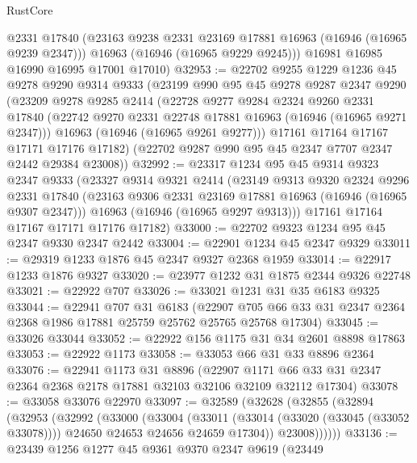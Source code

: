 \begin{lexlean}{RustCore}
\begin{coremodule}
        @2331
        @17840
        (@23163 @9238 @2331 @23169 @17881 @16963 (@16946 (@16965 @9239 @2347)))
        @16963
        (@16946 (@16965 @9229 @9245)))
      @16981
      @16985
      @16990
      @16995
      @17001
      @17010)
@32953 := @22702
    @9255
    @1229
    @1236
    @45
    @9278
    @9290
    @9314
    @9333
    (@23199
      @990
      @95
      @45
      @9278
      @9287
      @2347
      @9290
      (@23209
        @9278
        @9285
        @2414
        (@22728
          @9277
          @9284
          @2324
          @9260
          @2331
          @17840
          (@22742 @9270 @2331 @22748 @17881 @16963 (@16946 (@16965 @9271 @2347)))
          @16963
          (@16946 (@16965 @9261 @9277)))
        @17161
        @17164
        @17167
        @17171
        @17176
        @17182)
      (@22702 @9287 @990 @95 @45 @2347 @7707 @2347 @2442 @29384 @23008))
@32992 := @23317
    @1234
    @95
    @45
    @9314
    @9323
    @2347
    @9333
    (@23327
      @9314
      @9321
      @2414
      (@23149
        @9313
        @9320
        @2324
        @9296
        @2331
        @17840
        (@23163 @9306 @2331 @23169 @17881 @16963 (@16946 (@16965 @9307 @2347)))
        @16963
        (@16946 (@16965 @9297 @9313)))
      @17161
      @17164
      @17167
      @17171
      @17176
      @17182)
@33000 := @22702 @9323 @1234 @95 @45 @2347 @9330 @2347 @2442
@33004 := @22901 @1234 @45 @2347 @9329
@33011 := @29319 @1233 @1876 @45 @2347 @9327 @2368 @1959
@33014 := @22917 @1233 @1876 @9327
@33020 := @23977 @1232 @31 @1875 @2344 @9326 @22748
@33021 := @22922 @707
@33026 := @33021 @1231 @31 @35 @6183 @9325
@33044 := @22941
    @707
    @31
    @6183
    (@22907 @705 @66 @33 @31 @2347 @2364 @2368 @1986 @17881 @25759 @25762 @25765 @25768 @17304)
@33045 := @33026 @33044
@33052 := @22922 @156 @1175 @31 @34 @2601 @8898 @17863
@33053 := @22922 @1173
@33058 := @33053 @66 @31 @33 @8896 @2364
@33076 := @22941
    @1173
    @31
    @8896
    (@22907 @1171 @66 @33 @31 @2347 @2364 @2368 @2178 @17881 @32103 @32106 @32109 @32112 @17304)
@33078 := @33058 @33076 @22970
@33097 := @32589
    (@32628
      (@32855
        (@32894
          (@32953
            (@32992
              (@33000
                (@33004
                  (@33011
                    (@33014 (@33020 (@33045 (@33052 @33078))))
                    @24650
                    @24653
                    @24656
                    @24659
                    @17304))
                @23008))))))
@33136 := @23439
    @1256
    @1277
    @45
    @9361
    @9370
    @2347
    @9619
    (@23449

\end{coremodule}
\end{lexlean}
